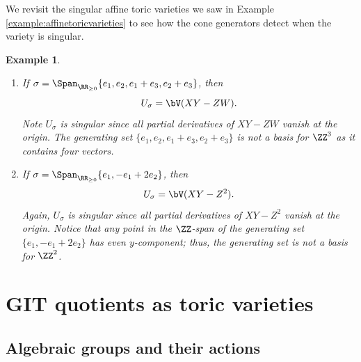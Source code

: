 \documentclass[12pt]{amsart}
\theoremstyle{plain}
\newtheorem{example}[theorem]{Example}
\begin{document}
We revisit the singular affine toric varieties we saw in Example \ref{example:affinetoricvarieties} to see how the cone generators detect when the variety is singular.

\begin{example}
\begin{enumerate}
\item If $\sigma = \Span_{\RR_{\ge 0}}\{e_1, e_2, e_1+e_3, e_2+e_3\}$, then
$$U_\sigma = \bV(XY - ZW).$$
Note $U_\sigma$ is singular since all partial derivatives of $XY-ZW$ vanish at the origin.
The generating set $\{e_1, e_2, e_1+e_3, e_2+e_3\}$ is not a basis for $\ZZ^3$ as it contains four vectors.
\item If $\sigma = \Span_{\RR_{\ge 0}}\{e_1, -e_1+2e_2\}$, then
$$U_\sigma = \bV(XY - Z^2).$$
Again, $U_\sigma$ is singular since all partial derivatives of $XY-Z^2$ vanish at the origin.
Notice that any point in the $\ZZ$-span of the generating set $\{e_1, -e_1+2e_2\}$ has even $y$-component; thus, the generating set is not a basis for $\ZZ^2$.
\end{enumerate}
\end{example}








\newpage
\section{GIT quotients as toric varieties}\label{chapter:gitquotientsastoricvarieties}
%




\subsection{Algebraic groups and their actions}
\end{document}
